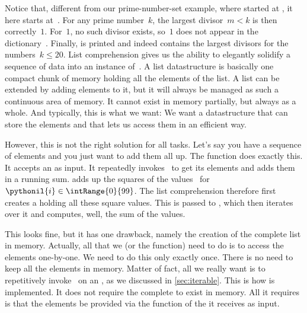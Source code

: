 Notice that, different from our prime-number-set example, where  started at , it here  starts at~.
For any prime number~$k$, the largest divisor~$m<k$ is then correctly~$1$.
For~$1$, no such divisor exists, so~$1$ does not appear in the dictionary~.
Finally,  is printed and indeed contains the largest divisors for the numbers~$k\leq20$.%
%
\FloatBarrier%
\endhsection%
%
%
\label{sec:generatorExpressions}%
%
List comprehension gives us the ability to elegantly solidify a sequence of data into an instance of~.
A list datastructure is basically one compact chunk of memory holding all the elements of the list.
A list can be extended by adding elements to it, but it will always be managed as such a continuous area of memory.
It cannot exist in memory partially, but always as a whole.
And typically, this is what we want:
We want a datastructure that can store the elements and that lets us access them in an efficient way.

However, this is not the right solution for all tasks.
Let's say you have a sequence of elements and you just want to add them all up.
The  function does exactly this.
It accepts an  as input.
It repeatedly invokes~ to get its elements and adds them in a running sum.
 adds up the squares of the values~ for~$\pythonil{i}\in\intRange{0}{99}$.
The list comprehension therefore first creates a  holding all these square values.
This  is passed to , which then iterates over it and computes, well, the sum of the values.

This looks fine, but it has one drawback, namely the creation of the complete list in memory.
Actually, all that we (or the  function) need to do is to access the elements one-by-one.
We need to do this only exactly once.
There is no need to keep all the elements in memory.
Matter of fact, all we really want is to repetitively invoke~ on an , as we discussed in \cref{sec:iterable}.
This is how  is implemented.
It does not require the complete  to exist in memory.
All it requires is that the elements be provided via the  function of the  it receives as input.

